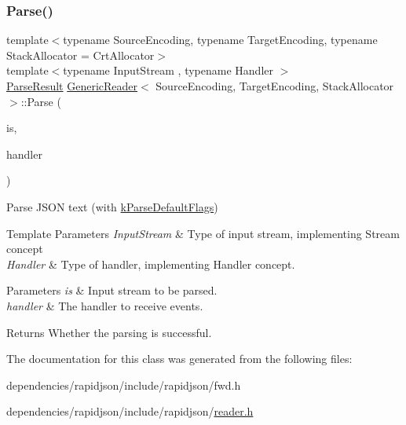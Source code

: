 \subsubsection{\texorpdfstring{Parse()}{Parse()}\hspace{0.1cm}{\footnotesize\ttfamily [2/2]}}
{\footnotesize\ttfamily template$<$typename Source\+Encoding, typename Target\+Encoding, typename Stack\+Allocator = Crt\+Allocator$>$ \\
template$<$typename Input\+Stream , typename Handler $>$ \\
\hyperlink{struct_parse_result}{Parse\+Result} \hyperlink{class_generic_reader}{Generic\+Reader}$<$ Source\+Encoding, Target\+Encoding, Stack\+Allocator $>$\+::Parse (\begin{DoxyParamCaption}\item[{Input\+Stream \&}]{is,  }\item[{Handler \&}]{handler }\end{DoxyParamCaption})\hspace{0.3cm}{\ttfamily [inline]}}



Parse J\+S\+ON text (with \hyperlink{reader_8h_ab7be7dabe6ffcba60fad441505583450a9104b0946d648e9467cb7a967401ec80}{k\+Parse\+Default\+Flags}) 


\begin{DoxyTemplParams}{Template Parameters}
{\em Input\+Stream} & Type of input stream, implementing Stream concept \\
\hline
{\em Handler} & Type of handler, implementing Handler concept. \\
\hline
\end{DoxyTemplParams}

\begin{DoxyParams}{Parameters}
{\em is} & Input stream to be parsed. \\
\hline
{\em handler} & The handler to receive events. \\
\hline
\end{DoxyParams}
\begin{DoxyReturn}{Returns}
Whether the parsing is successful. 
\end{DoxyReturn}


The documentation for this class was generated from the following files\+:\begin{DoxyCompactItemize}
\item 
dependencies/rapidjson/include/rapidjson/fwd.\+h\item 
dependencies/rapidjson/include/rapidjson/\hyperlink{reader_8h}{reader.\+h}\end{DoxyCompactItemize}
